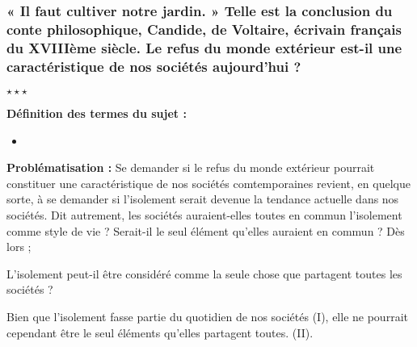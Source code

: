 \newpage \begin{center}
	\subsubsection*{« Il faut cultiver notre jardin. » Telle est la conclusion du conte philosophique, Candide, de Voltaire, écrivain français du XVIIIème siècle. \newline Le refus du monde extérieur est-il une caractéristique de nos sociétés aujourd’hui ?}
	$\star \star \star$
\end{center}

\noindent \textbf{Définition des termes du sujet :}

\begin{itemize}
	\item 
\end{itemize}

\noindent \textbf{Problématisation :} Se demander si le refus du monde extérieur pourrait constituer une caractéristique de nos sociétés comtemporaines revient, en quelque sorte, à se demander si l'isolement serait devenue la tendance actuelle dans nos sociétés. Dit autrement, les sociétés auraient-elles toutes en commun l'isolement comme style de vie ? Serait-il le seul élément qu'elles auraient en commun ? Dès lors ;

L'isolement peut-il être considéré comme la seule chose que partagent toutes les sociétés ?\newline

Bien que l'isolement fasse partie du quotidien de nos sociétés (I), elle ne pourrait cependant être le seul éléments qu'elles partagent toutes. (II).\newline

